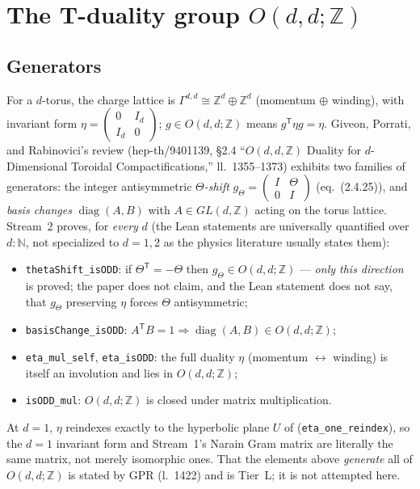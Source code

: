 \documentclass[11pt,a4paper]{article}
\theoremstyle{remark}
\begin{document}
\section{The T-duality group $O(d,d;\mathbb{Z})$}
\label{sec:tduality}

\subsection{Generators}
\label{sec:odd}
For a $d$-torus, the charge lattice is $\Gamma^{d,d}\cong\mathbb{Z}^d\oplus\mathbb{Z}^d$
(momentum $\oplus$ winding), with invariant form $\eta=\begin{pmatrix}0&I_d\\I_d&0\end{pmatrix}$;
$g\in O(d,d;\mathbb{Z})$ means $g^{\mathsf T}\eta g=\eta$. Giveon, Porrati, and Rabinovici's review
(hep-th/9401139, \S2.4 ``$O(d,d,\mathbb{Z})$ Duality for $d$-Dimensional Toroidal
Compactifications,'' ll.~1355--1373) exhibits two families of generators: the integer
antisymmetric \emph{$\Theta$-shift}
$g_\Theta=\begin{pmatrix}I&\Theta\\0&I\end{pmatrix}$ (eq.~(2.4.25)), and \emph{basis changes}
$\operatorname{diag}(A,B)$ with $A\in GL(d,\mathbb{Z})$ acting on the torus lattice. Stream~2
proves, for \emph{every} $d$ (the Lean statements are universally quantified over $d:\mathbb{N}$,
not specialized to $d=1,2$ as the physics literature usually states them):
\begin{itemize}
  \item \texttt{thetaShift\_isODD}: if $\Theta^{\mathsf T}=-\Theta$ then $g_\Theta\in O(d,d;\mathbb{Z})$
    --- \emph{only this direction} is proved; the paper does not claim, and the Lean statement
    does not say, that $g_\Theta$ preserving $\eta$ forces $\Theta$ antisymmetric;
  \item \texttt{basisChange\_isODD}: $A^{\mathsf T}B=1\Rightarrow \operatorname{diag}(A,B)\in O(d,d;\mathbb{Z})$;
  \item \texttt{eta\_mul\_self}, \texttt{eta\_isODD}: the full duality $\eta$ (momentum
    $\leftrightarrow$ winding) is itself an involution and lies in $O(d,d;\mathbb{Z})$;
  \item \texttt{isODD\_mul}: $O(d,d;\mathbb{Z})$ is closed under matrix multiplication.
\end{itemize}
At $d=1$, $\eta$ reindexes exactly to the hyperbolic plane $U$ of 
(\texttt{eta\_one\_reindex}), so the $d=1$ invariant form and Stream~1's Narain Gram matrix are
literally the same matrix, not merely isomorphic ones. That the elements above \emph{generate}
all of $O(d,d;\mathbb{Z})$ is stated by GPR (l.~1422) and is Tier~L; it is not attempted here.
\end{document}
